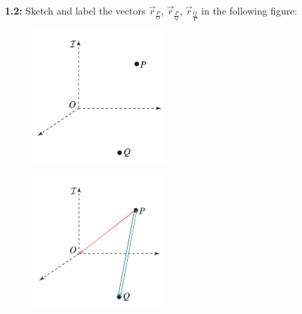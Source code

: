 \begin{homeworkProblem}

	\textbf{1.2:} Sketch and label the vectors \( \vec{r}_{\frac{P}{O}} \), \( \vec{r}_{\frac{P}{Q}} \), \( \vec{r}_{\frac{Q}{P}} \) in the following figure:

	\begin{figure}[ht]
		\begin{center}
			\includegraphics[width=0.45\textwidth]{images/01-1.2.png}
		\end{center}
	\end{figure}

	\solution

	\begin{figure}[ht]
		\begin{center}
			\includegraphics[width=0.45\textwidth]{images/solution 01-1.2.png}
		\end{center}
	\end{figure}

\end{homeworkProblem}

